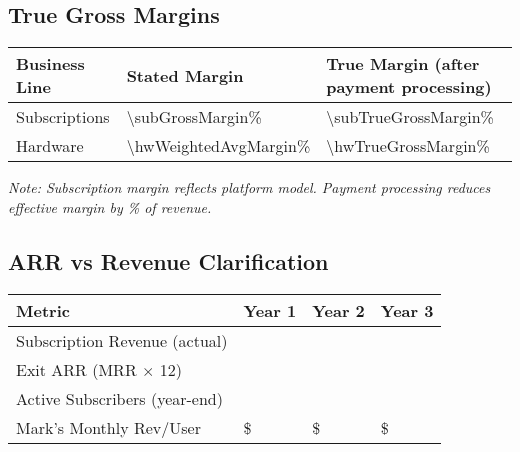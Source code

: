 \subsection{True Gross Margins}
\begin{table}[H]
\centering
\begin{tabularx}{\linewidth}{l Y Y}
\toprule
Business Line & Stated Margin & True Margin (after payment processing) \\\midrule
Subscriptions & \num{\subGrossMargin}\% & \num{\subTrueGrossMargin}\% \\
Hardware & \num{\hwWeightedAvgMargin}\% & \num{\hwTrueGrossMargin}\% \\
\bottomrule
\end{tabularx}
\end{table}
\textit{Note: Subscription margin reflects platform model. Payment processing reduces effective margin by \% of revenue.}

\subsection{ARR vs Revenue Clarification}
\begin{table}[H]
\centering
\begin{tabularx}{\linewidth}{l Y Y Y}
\toprule
Metric & Year 1 & Year 2 & Year 3 \\\midrule
Subscription Revenue (actual) & \numint{\subRevenueYearOne} & \numint{\subRevenueYearTwo} & \numint{\subRevenueYearThree} \\
Exit ARR (MRR $\times$ 12) & \numint{\subARRYearOne} & \numint{\subARRYearTwo} & \numint{\subARRYearThree} \\
Active Subscribers (year-end) & \numint{\totalSubsYearOne} & \numint{\totalSubsYearTwo} & \numint{\totalSubsYearThree} \\
Mark's Monthly Rev/User & \$\numfpeval{\markWeightedAvgMonthly} & \$\numfpeval{\markWeightedAvgMonthly} & \$\numfpeval{\markWeightedAvgMonthly} \\
\bottomrule
\end{tabularx}
\end{table}

